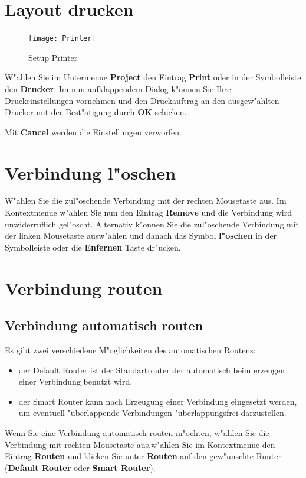 \documentclass[a4paper,titlepage,12pt,ngerman]{scrbook}
\begin{document}
\section{Layout drucken}
\begin{figure}[htbp]

\begin{center}

\texttt{[image: Printer]}

\caption{Setup Printer}\label{test}

\end{center}

\end{figure}
W"ahlen Sie im Untermenue {\bf Project} den Eintrag {\bf Print} oder in der Symbolleiste den {\bf Drucker}. Im nun aufklappendem Dialog k"onnen Sie Ihre Druckeinstellungen vornehmen und den Druckauftrag an den ausgew"ahlten Drucker mit der Best"atigung durch {\bf OK} schicken.\par
Mit {\bf Cancel} werden die Einstellungen verworfen.\par


\section{Verbindung l"oschen}
W"ahlen Sie die zul"oschende Verbindung mit der rechten Mousetaste aus. Im Kontextmenue w"ahlen Sie nun den Eintrag {\bf Remove} und die Verbindung wird unwiderruflich gel"oscht.
Alternativ k"onnen Sie die zul"oschende Verbindung mit der linken Mousetaste ausw"ahlen und danach das Symbol {\bf l"oschen} in der Symbolleiste oder die {\bf Enfernen} Taste dr"ucken. 


\section{Verbindung routen}
\subsection{Verbindung automatisch routen}
Es gibt zwei verschiedene M"oglichkeiten des automatischen Routens:
\begin{itemize}
\item der Default Router ist der Standartrouter der automatisch beim erzeugen einer Verbindung benutzt wird.
\item der Smart Router kann nach Erzeugung einer Verbindung eingesetzt werden, um eventuell "uberlappende Verbindungen "uberlappungsfrei darzustellen.
\end{itemize}
Wenn Sie eine Verbindung automatisch routen m"ochten, w"ahlen Sie die Verbindung mit rechten Mousetaste aus,w"ahlen Sie im Kontextmenue den Eintrag {\bf Routen} und klicken Sie unter {\bf Routen} auf den gew"unschte Router ({\bf Default Router} oder {\bf Smart Router}).
\end{document}
